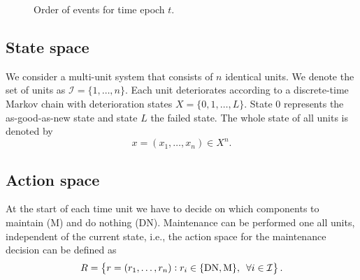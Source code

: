 \documentclass[a4paper,12pt]{article}
\begin{document}
\begin{figure}[H]
	\centering
	\caption{Order of events for time epoch $t$.}
\end{figure}

\subsection{State space}
We consider a multi-unit system that consists of $n$ identical units. We denote the set of units as $\mathcal{I} = \{1, \dots, n\}$. Each unit deteriorates according to a discrete-time Markov chain with deterioration states $X = \{0, 1, \dots, L\}$. State $0$ represents the as-good-as-new state and state $L$ the failed state. The whole state of all units is denoted by
$$
x = (x_1, \dots, x_n) \in X^n.
$$

\subsection{Action space}
At the start of each time unit we have to decide on which components to maintain (M) and do nothing (DN). Maintenance can be performed one all units, independent of the current state, i.e., the action space for the maintenance decision can be defined as
$$
R = \left \{r = (r_1, \dots, r_n): r_i \in \{\text{DN}, \text{M}\}, \enskip \forall i \in \mathcal{I} \right \}.
$$
\end{document}
